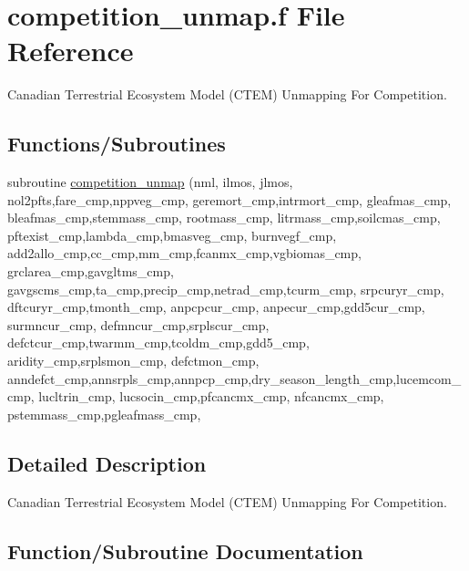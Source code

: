 \hypertarget{competition__unmap_8f}{}\section{competition\+\_\+unmap.\+f File Reference}
\label{competition__unmap_8f}


Canadian Terrestrial Ecosystem Model (C\+T\+E\+M) Unmapping For Competition.  


\subsection*{Functions/\+Subroutines}
\begin{DoxyCompactItemize}
\item 
subroutine \hyperlink{competition__unmap_8f_ab970a794d878e125da563f7022d2d3a4}{competition\+\_\+unmap} (nml, ilmos, jlmos, nol2pfts,fare\+\_\+cmp,nppveg\+\_\+cmp, geremort\+\_\+cmp,intrmort\+\_\+cmp, gleafmas\+\_\+cmp, bleafmas\+\_\+cmp,stemmass\+\_\+cmp, rootmass\+\_\+cmp, litrmass\+\_\+cmp,soilcmas\+\_\+cmp, pftexist\+\_\+cmp,lambda\+\_\+cmp,bmasveg\+\_\+cmp, burnvegf\+\_\+cmp, add2allo\+\_\+cmp,cc\+\_\+cmp,mm\+\_\+cmp,fcanmx\+\_\+cmp,vgbiomas\+\_\+cmp, grclarea\+\_\+cmp,gavgltms\+\_\+cmp, gavgscms\+\_\+cmp,ta\+\_\+cmp,precip\+\_\+cmp,netrad\+\_\+cmp,tcurm\+\_\+cmp, srpcuryr\+\_\+cmp, dftcuryr\+\_\+cmp,tmonth\+\_\+cmp, anpcpcur\+\_\+cmp, anpecur\+\_\+cmp,gdd5cur\+\_\+cmp, surmncur\+\_\+cmp, defmncur\+\_\+cmp,srplscur\+\_\+cmp, defctcur\+\_\+cmp,twarmm\+\_\+cmp,tcoldm\+\_\+cmp,gdd5\+\_\+cmp, aridity\+\_\+cmp,srplsmon\+\_\+cmp, defctmon\+\_\+cmp, anndefct\+\_\+cmp,annsrpls\+\_\+cmp,annpcp\+\_\+cmp,dry\+\_\+season\+\_\+length\+\_\+cmp,lucemcom\+\_\+cmp, lucltrin\+\_\+cmp, lucsocin\+\_\+cmp,pfcancmx\+\_\+cmp, nfcancmx\+\_\+cmp, pstemmass\+\_\+cmp,pgleafmass\+\_\+cmp,
\end{DoxyCompactItemize}


\subsection{Detailed Description}
Canadian Terrestrial Ecosystem Model (C\+T\+E\+M) Unmapping For Competition. 



\subsection{Function/\+Subroutine Documentation}
\hypertarget{competition__unmap_8f_ab970a794d878e125da563f7022d2d3a4}{}
